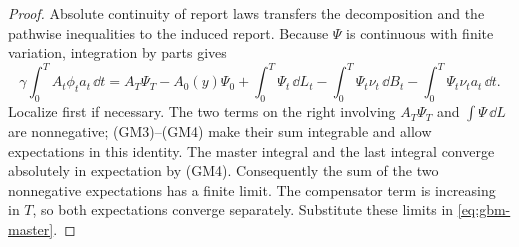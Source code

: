\documentclass[12pt]{article}
\begin{document}
\begin{proof}
Absolute continuity of report laws transfers the decomposition and
the pathwise inequalities to the induced report. Because \(\Psi\)
is continuous with finite variation, integration by parts gives
\[
  \gamma\int_0^T A_t\phi_ta_t\,\dd t
  =A_T\Psi_T-A_0(y)\Psi_0
     +\int_0^T\Psi_t\,\dd L_t
     -\int_0^T\Psi_t\nu_t\,\dd B_t
     -\int_0^T\Psi_t\nu_ta_t\,\dd t.
\]
Localize first if necessary. The two terms on the right involving
\(A_T\Psi_T\) and \(\int\Psi\,\dd L\) are nonnegative;
(GM3)--(GM4) make their sum integrable and allow expectations in
this identity. The master integral and the last integral converge
absolutely in expectation by (GM4). Consequently the sum of the
two nonnegative expectations has a finite limit. The compensator
term is increasing in \(T\), so both expectations converge
separately. Substitute these limits in \eqref{eq:gbm-master}.
\end{proof}
\end{document}
